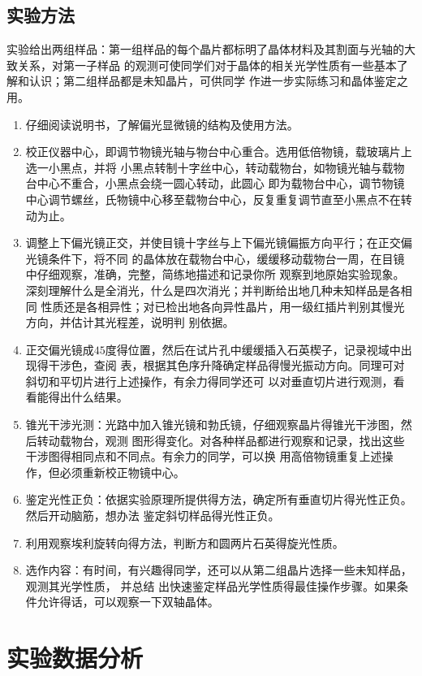 \documentclass[11pt,a4paper]{article}
\begin{document}
\begin{spacing}{1.3}
\begin{CJK*}{UTF8}{gbsn}
\subsection{实验方法}
实验给出两组样品：第一组样品的每个晶片都标明了晶体材料及其割面与光轴的大致关系，对第一子样品
的观测可使同学们对于晶体的相关光学性质有一些基本了解和认识；第二组样品都是未知晶片，可供同学
作进一步实际练习和晶体鉴定之用。
\begin{enumerate}
\item 仔细阅读说明书，了解偏光显微镜的结构及使用方法。
\item 校正仪器中心，即调节物镜光轴与物台中心重合。选用低倍物镜，载玻璃片上选一小黑点，并将
小黑点转制十字丝中心，转动载物台，如物镜光轴与载物台中心不重合，小黑点会绕一圆心转动，此圆心
即为载物台中心，调节物镜中心调节螺丝，氏物镜中心移至载物台中心，反复重复调节直至小黑点不在转
动为止。
\item 调整上下偏光镜正交，并使目镜十字丝与上下偏光镜偏振方向平行；在正交偏光镜条件下，将不同
的晶体放在载物台中心，缓缓移动载物台一周，在目镜中仔细观察，准确，完整，简练地描述和记录你所
观察到地原始实验现象。深刻理解什么是全消光，什么是四次消光；并判断给出地几种未知样品是各相同
性质还是各相异性；对已检出地各向异性晶片，用一级红插片判别其慢光方向，并估计其光程差，说明判
别依据。
\item 正交偏光镜成$45$度得位置，然后在试片孔中缓缓插入石英楔子，记录视域中出现得干涉色，查阅
表，根据其色序升降确定样品得慢光振动方向。同理可对斜切和平切片进行上述操作，有余力得同学还可
以对垂直切片进行观测，看看能得出什么结果。
\item 锥光干涉光测：光路中加入锥光镜和勃氏镜，仔细观察晶片得锥光干涉图，然后转动载物台，观测
图形得变化。对各种样品都进行观察和记录，找出这些干涉图得相同点和不同点。有余力的同学，可以换
用高倍物镜重复上述操作，但必须重新校正物镜中心。
\item 鉴定光性正负：依据实验原理所提供得方法，确定所有垂直切片得光性正负。然后开动脑筋，想办法
鉴定斜切样品得光性正负。
\item 利用观察埃利旋转向得方法，判断方和圆两片石英得旋光性质。
\item 选作内容：有时间，有兴趣得同学，还可以从第二组晶片选择一些未知样品，观测其光学性质，
并总结 出快速鉴定样品光学性质得最佳操作步骤。如果条件允许得话，可以观察一下双轴晶体。
\end{enumerate}

\section{实验数据分析}


\end{CJK*}
\end{spacing}
\end{document}
